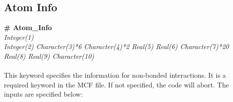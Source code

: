 %
%
%
%
%
%
\subsection{Atom Info}\label{sec:Get_Atom_Info}
%
{\bf \# Atom\_Info} \\
{\it Integer(1)} \\
{\it Integer(2)   Character(3)*6  Character(4)*2   Real(5)   Real(6)
  Character(7)*20     Real(8)    Real(9)  Character(10)} \\ \\
%
This keyword specifies the information for non-bonded interactions. 
It is a required keyword in the MCF file. If not specified, the code will abort. The inputs are specified below: 
%
